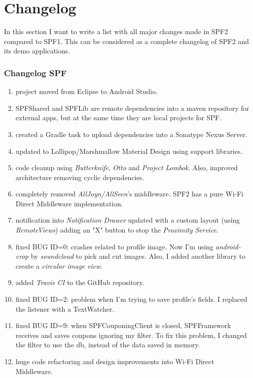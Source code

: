 \chapter{Changelog}
\label{changelog}

In this section I want to write a list with all major changes made in SPF2 compared to SPF1. This can be considered as a complete changelog of SPF2 and its demo applications.

\subsection*{Changelog SPF}
\begin{enumerate}
	\item project moved from Eclipse to Android Studio.
	\item SPFShared and SPFLib are remote dependencies into a maven repository for external apps, but at the same time they are local projects for SPF.
	\item created a Gradle task to upload dependencies into a Sonatype Nexus Server.
	\item updated to Lollipop/Marshmallow Material Design using support libraries.
	\item code cleanup using \emph{Butterknife}, \emph{Otto} and \emph{Project Lombok}. Also, improved architecture removing cyclic dependencies.
	\item completely removed \emph{AllJoyn/AllSeen}'s middleware. SPF2 has a pure Wi-Fi Direct Middleware implementation.
	\item notification into \emph{Notification Drawer} updated with a custom layout (using \emph{RemoteViews}) adding an "X" button to stop the \emph{Proximity Service}.
	\item fixed BUG ID=0: crashes related to profile image. Now I'm using \emph{android-crop} by \emph{soundcloud} to pick and cut images. Also, I added another library to create a \emph{circular image view}.
	\item added \emph{Travis CI} to the GitHub repository.
	\item fixed BUG ID=2: problem when I'm trying to save profile's fields. I replaced the listener with a \textsf{TextWatcher}.
	\item fixed BUG ID=9: when \textsf{SPFCouponingClient} is closed, \textsf{SPFFramework} receives and saves coupons ignoring my filter. To fix this problem, I changed the filter to use the db, instead of the data saved in memory.
	\item huge code refactoring and design improvements into Wi-Fi Direct Middleware.

\end{enumerate}
